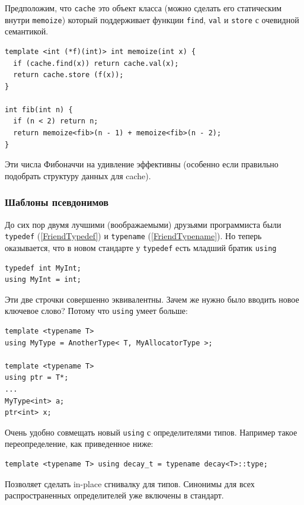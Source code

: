 \documentclass[a4paper,12pt,oneside]{article}
\begin{document}
Предположим, что \lstinline!cache! это объект класса (можно сделать его статическим внутри \lstinline!memoize!) который поддерживает функции \lstinline!find!, \lstinline!val! и \lstinline!store! с очевидной семантикой.

\begin{lstlisting}
template <int (*f)(int)> int memoize(int x) {
  if (cache.find(x)) return cache.val(x);
  return cache.store (f(x));
}

int fib(int n) {
  if (n < 2) return n;
  return memoize<fib>(n - 1) + memoize<fib>(n - 2);
}
\end{lstlisting}

Эти числа Фибоначчи на удивление эффективны (особенно если правильно подобрать структуру данных для cache).

\subsubsection{Шаблоны псевдонимов}\label{FriendUsing}

До сих пор двумя лучшими (воображаемыми) друзьями программиста были \lstinline!typedef! (\ref{FriendTypedef}) и \lstinline!typename! (\ref{FriendTypename}). Но теперь оказывается, что в новом стандарте у \lstinline!typedef! есть младший братик \lstinline!using!

\begin{lstlisting}
typedef int MyInt;
using MyInt = int;
\end{lstlisting}

Эти две строчки совершенно эквивалентны. Зачем же нужно было вводить новое ключевое слово? Потому что \lstinline!using! умеет больше:

\begin{lstlisting}
template <typename T> 
using MyType = AnotherType< T, MyAllocatorType >; 

template <typename T> 
using ptr = T*;
...
MyType<int> a;
ptr<int> x;
\end{lstlisting}

Очень удобно совмещать новый \lstinline!using! с определителями типов. Например такое переопределение, как приведенное ниже:

\begin{lstlisting}
template <typename T> using decay_t = typename decay<T>::type;
\end{lstlisting}

Позволяет сделать in-place сгнивалку для типов. Синонимы для всех распространенных определителей уже включены в стандарт.
\end{document}
